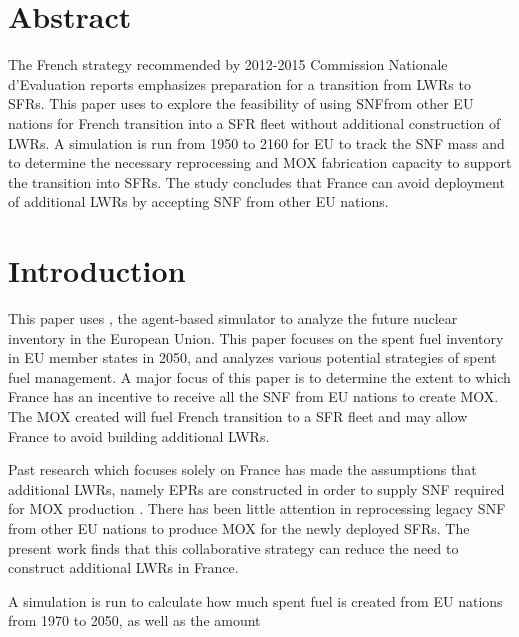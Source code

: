 \section{Abstract}
The French strategy recommended by 2012-2015 Commission Nationale d'Evaluation reports
\cite{cne2_noauthor_2015} emphasizes preparation for a transition from \glspl{LWR} to \glspl{SFR}.
This paper uses \Cyclus to explore the feasibility of using \gls{SNF}from other EU nations
for French transition into a \gls{SFR} fleet without additional construction of \glspl{LWR}.
A \Cyclus simulation is run from 1950 to 2160 for EU to track the \gls{SNF} mass
and to determine the necessary reprocessing and \gls{MOX} fabrication capacity to support
the transition into \glspl{SFR}. The study concludes that France can avoid deployment
of additional \glspl{LWR} by accepting \gls{SNF} from other EU nations.


\section{Introduction}
This paper uses \Cyclus, the agent-based simulator \cite{huff_fundamental_2016} to analyze
the future nuclear inventory in the European Union. This paper focuses on the spent fuel
inventory in \gls{EU} member states in 2050, and analyzes various potential strategies of spent fuel
management.
A major focus of this paper is to determine the extent to which France has an incentive
to receive all the \gls{SNF} from \gls{EU} nations to create \gls{MOX}.
The \gls{MOX} created will fuel French transition to a \gls{SFR} fleet
and may allow France to avoid building additional \glspl{LWR}.

Past research which focuses solely on France has made the assumptions that additional \glspl{LWR},
namely \glspl{EPR} are constructed in order to supply \gls{SNF} required
for \gls{MOX} production \cite{carre_overview_2009, martin_symbiotic_2007, freynet_multiobjective_2016}.
There has been little attention in reprocessing legacy \gls{SNF} from other
EU nations to produce \gls{MOX} for the newly deployed \glspl{SFR}.
The present work finds that this collaborative strategy can reduce the
need to construct additional \glspl{LWR} in France.

A \Cyclus simulation is run to calculate
how much spent fuel is created from \gls{EU} nations from 1970 to 2050, as well as the amount

